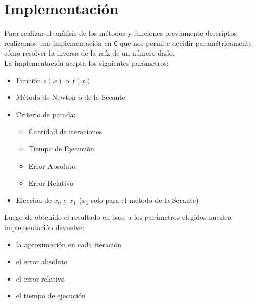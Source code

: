 
\section{Implementación}

Para realizar el análisis de los métodos y funciones previamente descriptos
realizamos una implementación en \verb|C| que nos permite decidir
paramétricamente cómo resolver la inversa de la raíz de un número dado.\\

La implementación acepta los siguientes parámetros:

\begin{itemize}
    \item Función $e(x)$ o $f(x)$
    \item Método de Newton o de la Secante
    \item Criterio de parada:
    \begin{itemize}
        \item Cantidad de iteraciones
        \item Tiempo de Ejecución
        \item Error Absoluto
        \item Error Relativo
    \end{itemize}
    \item Eleccion de $x_0$ y $x_1$ ($x_1$ solo para el método de la Secante)
\end{itemize}

Luego de obtenido el resultado en base a los parámetros elegidos nuestra
implementación devuelve:

\begin{itemize}
    \item la aproximación en cada iteración
    \item el error absoluto
    \item el error relativo
    \item el tiempo de ejecución
\end{itemize}

